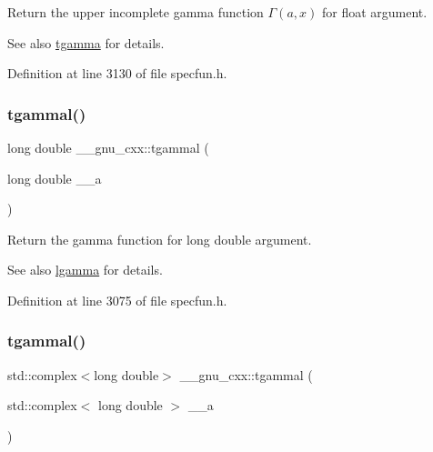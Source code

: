 Return the upper incomplete gamma function $ \Gamma(a,x) $ for {\ttfamily float} argument.

\begin{DoxySeeAlso}{See also}
\hyperlink{group__mathsf__gnu_ga73a634663e4eceb1e6bcf3fc16773b7b}{tgamma} for details. 
\end{DoxySeeAlso}


Definition at line 3130 of file specfun.\+h.

\mbox{\label{group__mathsf__gnu_ga2c7d954852d84665aabd43566d67e344}} 
\subsubsection{\texorpdfstring{tgammal()}{tgammal()}\hspace{0.1cm}{\footnotesize\ttfamily [1/3]}}
{\footnotesize\ttfamily long double \+\_\+\+\_\+gnu\+\_\+cxx\+::tgammal (\begin{DoxyParamCaption}\item[{long double}]{\+\_\+\+\_\+a }\end{DoxyParamCaption})\hspace{0.3cm}{\ttfamily [inline]}}

Return the gamma function for {\ttfamily  long double } argument.

\begin{DoxySeeAlso}{See also}
\hyperlink{group__mathsf__gnu_ga40fa5127f7c419ed1d8f1c6a6f96ea9b}{lgamma} for details. 
\end{DoxySeeAlso}


Definition at line 3075 of file specfun.\+h.

\mbox{\label{group__mathsf__gnu_ga8d53515dba9c860fd6058a4b75aaff58}} 
\subsubsection{\texorpdfstring{tgammal()}{tgammal()}\hspace{0.1cm}{\footnotesize\ttfamily [2/3]}}
{\footnotesize\ttfamily std\+::complex$<$long double$>$ \+\_\+\+\_\+gnu\+\_\+cxx\+::tgammal (\begin{DoxyParamCaption}\item[{std\+::complex$<$ long double $>$}]{\+\_\+\+\_\+a }\end{DoxyParamCaption})\hspace{0.3cm}{\ttfamily [inline]}}

